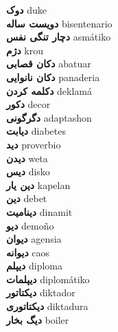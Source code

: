 \textbf{ دوک  } duke \\
\textbf{ دویست ساله  } bisentenario \\
\textbf{ دچار تنگی نفس  } asmátiko \\
\textbf{ دژم  } krou \\
\textbf{ دکان قصابی  } abatuar \\
\textbf{ دکان نانوایی  } panaderia \\
\textbf{ دکلمه کردن  } deklamá \\
\textbf{ دکور  } decor \\
\textbf{ دگرگونی  } adaptashon \\
\textbf{ دیابت  } diabetes \\
\textbf{ دید  } proverbio \\
\textbf{ دیدن  } weta \\
\textbf{ دیس  } disko \\
\textbf{ دین یار  } kapelan \\
\textbf{ دین  } debet \\
\textbf{ دینامیت  } dinamit \\
\textbf{ دیو  } demoño \\
\textbf{ دیوان  } agensia \\
\textbf{ دیوانه  } caos \\
\textbf{ دیپلم  } diploma \\
\textbf{ دیپلمات  } diplomátiko \\
\textbf{ دیکتاتور  } diktador \\
\textbf{ دیکتاتوری  } diktadura \\
\textbf{ دیگ بخار  } boiler \\
